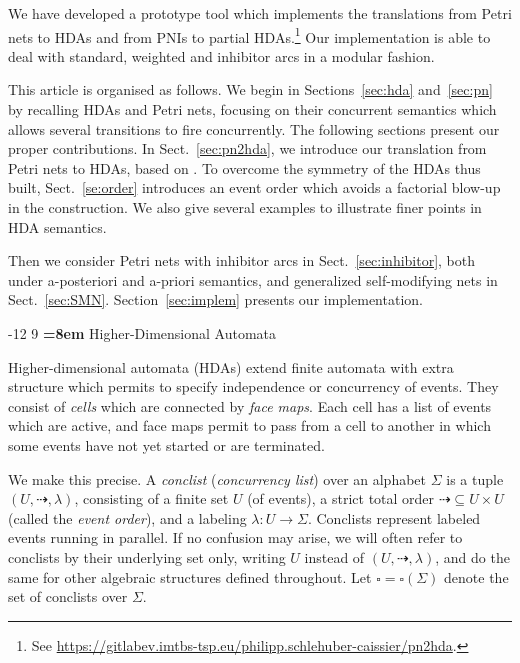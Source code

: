 \documentclass[runningheads,envcountsame]{llncs}
\makeatletter
\newcommand*\evord{\dashrightarrow}
\renewcommand\section{\@startsection{section}{1}{\z@}%
  {-12\p@ \@plus -3\p@ \@minus -3\p@}%
  {9\p@ \@plus 3\p@ \@minus 3\p@}%
  {\normalfont\large\bfseries\boldmath
    \rightskip=\z@ \@plus 8em\pretolerance=10000 }}
\makeatother
\begin{document}
We have developed a prototype tool which implements the translations from Petri nets to HDAs and from PNIs to partial HDAs.\footnote{%
  See \url{https://gitlabev.imtbs-tsp.eu/philipp.schlehuber-caissier/pn2hda}.}
Our implementation is able to deal with standard, weighted and inhibitor arcs in a modular fashion.

This article is organised as follows.
We begin in Sections~\ref{sec:hda} and~\ref{sec:pn} by recalling HDAs and Petri nets,
focusing on their concurrent semantics which allows several transitions to fire concurrently.
%
The following sections present our proper contributions.
In Sect.~\ref{sec:pn2hda}, we introduce our translation from Petri nets to HDAs, based on \cite{DBLP:journals/tcs/Glabbeek06}.
To overcome the symmetry of the HDAs thus built,
Sect.~\ref{se:order} introduces an event order which avoids a factorial blow-up in the construction.
We also give several examples to illustrate finer points in HDA semantics.

Then we consider Petri nets with inhibitor arcs in Sect.~\ref{sec:inhibitor},
both under a-posteriori and a-priori semantics,
and generalized self-modifying nets in Sect.~\ref{sec:SMN}.
Section~\ref{sec:implem} presents our implementation.

\section{Higher-Dimensional Automata}
\label{sec:hda}

Higher-dimensional automata (HDAs) extend finite automata
with extra structure which permits to specify independence or concurrency of events.
They consist of \emph{cells} which are connected by \emph{face maps}.
Each cell has a list of events which are active,
and face maps permit to pass from a cell to another in which some events have not yet started or are terminated.

We make this precise.
A \emph{conclist} (\emph{concurrency list}) over an alphabet $\Sigma$
is a tuple $(U, {\evord}, \lambda)$,
consisting of a finite set $U$ (of events),
a strict total order ${\evord}\subseteq U\times U$ (called the {\em event order}),
and a labeling $\lambda: U\to \Sigma$.
Conclists represent labeled events running in parallel.
If no confusion may arise,
we will often refer to conclists by their underlying set only, writing $U$ instead of $(U, {\evord}, \lambda)$,
and do the same for other algebraic structures defined throughout.
Let $\square=\square(\Sigma)$ denote the set of conclists over $\Sigma$.
\end{document}
